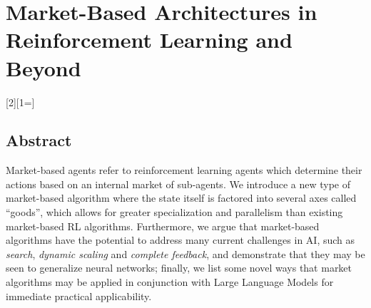 \chapter{Market-Based Architectures in Reinforcement Learning and Beyond}
\label{chap:market-based-rl}




[2][1=]{}


\section*{Abstract}

Market-based agents refer to reinforcement learning agents which determine their actions based on an internal market of sub-agents. We introduce a new type of market-based algorithm where the state itself is factored into several axes called ``goods'', which allows for greater specialization and parallelism than existing market-based RL algorithms. Furthermore, we argue that market-based algorithms have the potential to address many current challenges in AI, such as \emph{search}, \emph{dynamic scaling} and \emph{complete feedback}, and demonstrate that they may be seen to generalize neural networks; finally, we list some novel ways that market algorithms may be applied in conjunction with Large Language Models for immediate practical applicability.

